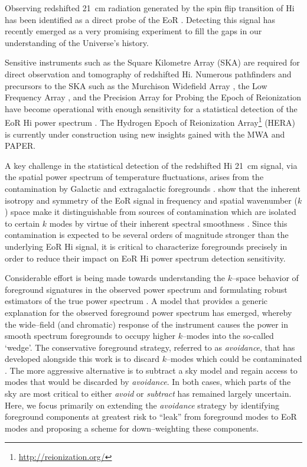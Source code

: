 \documentclass[preprint2,iop,numberedappendix,twocolappendix,appendixfloats]{emulateapj}
\begin{document}
Observing redshifted 21~cm radiation generated by the spin flip transition of H{\sc i} has been identified as a direct probe of the EoR \citep{sun72,sco90,mad97,toz00,ili02}. Detecting this signal has recently emerged as a very promising experiment to fill the gaps in our understanding of the Universe's history.  

Sensitive instruments such as the Square Kilometre Array (SKA) are required for direct observation and tomography of redshifted H{\sc i}. Numerous pathfinders and precursors to the SKA such as the Murchison Widefield Array \citep[MWA;][]{lon09,tin13,bow13}, the Low Frequency Array \citep[LOFAR;][]{van13}, and the Precision Array for Probing the Epoch of Reionization \citep[PAPER;][]{par10} have become operational with enough sensitivity for a statistical detection of the EoR H{\sc i} power spectrum \citep{bow06,par12a,bea13,dil13,thy13,pob14}. The Hydrogen Epoch of Reionization Array\footnote{\url{http://reionization.org/}} (HERA) is currently under construction using new insights gained with the MWA and PAPER.

A key challenge in the statistical detection of the redshifted H{\sc i} 21~cm signal, via the spatial power spectrum of temperature fluctuations, arises from the contamination by Galactic and extragalactic foregrounds \citep[see, e.g.,][]{dim02,zal04,fur06,ali08,ber09,ber10,gho12}. \citet{mor04} show that the inherent isotropy and symmetry of the EoR signal in frequency and spatial wavenumber ($k$) space make it distinguishable from sources of contamination which are isolated to certain $k$ modes by virtue of their inherent spectral smoothness \citep{mor06,bow09,liu11,par12b,dil13,pob13}. Since this contamination is expected to be several orders of magnitude stronger than the underlying EoR H{\sc i} signal, it is critical to characterize foregrounds precisely in order to reduce their impact on EoR H{\sc i} power spectrum detection sensitivity. 

Considerable effort is being made towards understanding the $k$--space behavior of foreground signatures in the observed power spectrum and formulating robust estimators of the true power spectrum \citep{bow09,liu09,dat10,liu11,mor12,tro12,pob13,thy13,dil14,liu14a,liu14b}. A model that provides a generic explanation for the observed foreground power spectrum has emerged, whereby the wide--field (and chromatic) response of the instrument causes the power in smooth spectrum foregrounds to occupy higher $k$--modes into the so-called `wedge'. The conservative foreground strategy, referred to as {\it avoidance}, that has developed alongside this work is to discard $k$--modes which could be contaminated \citep[e.g.,][]{par14}. The more aggressive alternative is to subtract a sky model and regain access to modes that would be discarded by {\it avoidance}. In both cases, which parts of the sky are most critical to either {\it avoid} or {\it subtract} has remained largely uncertain. Here, we focus primarily on extending the {\it avoidance} strategy by identifying foreground components at greatest risk to ``leak'' from foreground modes to EoR modes and proposing a scheme for down--weighting these components.
\end{document}
